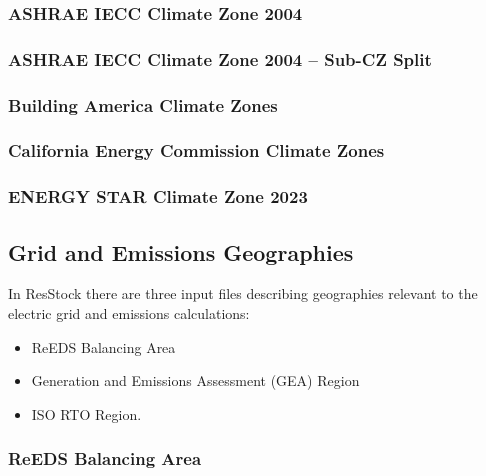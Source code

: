 \subsubsection{ASHRAE IECC Climate Zone 2004} \label{sec:ashrae_2004_tsv}


\subsubsection{ASHRAE IECC Climate Zone 2004 -- Sub-CZ Split}


\subsubsection{Building America Climate Zones}


\subsubsection{California Energy Commission Climate Zones}


\subsubsection{ENERGY STAR Climate Zone 2023}


\subsection{Grid and Emissions Geographies}

In ResStock there are three input files describing geographies relevant to the electric grid and emissions calculations:

\begin{itemize}
    \item ReEDS Balancing Area
    \item Generation and Emissions Assessment (GEA) Region
    \item ISO RTO Region.
\end{itemize}

\subsubsection{ReEDS Balancing Area}


